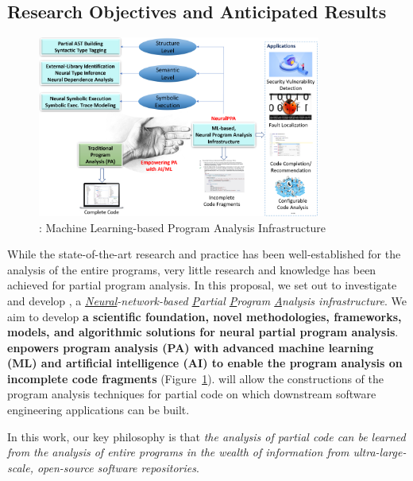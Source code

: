 \subsection{Research Objectives and Anticipated Results}

\begin{figure}[t]
    \centering
    \includegraphics[width=0.83\textwidth]{graphs/neuralppa}
    \vspace{-12pt}
    \caption{{\tool}: Machine Learning-based Program Analysis Infrastructure}
    \label{fig:arch}
\end{figure}


While the state-of-the-art research and practice has been
well-established for the analysis of the entire programs, very little
research and knowledge has been achieved for partial program
analysis.
%
In this proposal, we set out to investigate and develop {\tool}, a
{\em \underline{Neural}-network-based \underline{P}artial
  \underline{P}rogram \underline{A}nalysis infrastructure}. We aim to
develop {\bf a scientific foundation, novel methodologies, frameworks,
  models, and algorithmic solutions for neural partial program
  analysis}. {\tool} {\bf enpowers program analysis (PA) with advanced
machine learning (ML) and artificial intelligence (AI) to enable the
program analysis on incomplete code fragments} (Figure~\ref{fig:arch}).
{\tool} will allow the constructions of the program analysis
techniques for partial code on which downstream software
engineering applications can be built.


In this work, our key philosophy is that {\em the analysis of
  partial code can be learned from the analysis of entire programs in
  the wealth of information from ultra-large-scale, open-source
  software repositories}.




